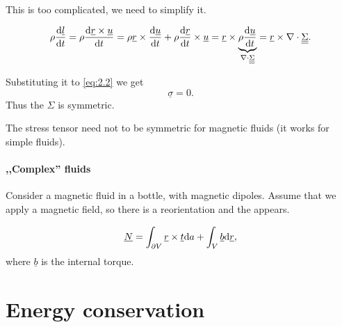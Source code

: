 \documentclass[11pt,oneside]{book}
\renewcommand{\vec}[1]{\underline{#1}}
\theoremstyle{definition} %
\theoremstyle{plain} %
\theoremstyle{remark} %
\theoremstyle{underline}
\begin{document}
  This is too complicated, we need to simplify it.
  
  \begin{displaymath}
    \rho \dfrac{ \vec l }{t} = \rho \dfrac{\vec r \times \vec u}{t} 
    = \rho \vec r \times \dfrac{\vec u}{t} + \rho \dfrac{ \vec r }{t} \times \vec u
    = \vec r \times \underbrace{\rho \dfrac{\vec u}{t}}_{\nabla \cdot \ten \Sigma} 
    = \vec r \times \nabla \cdot \ten \Sigma.
  \end{displaymath}

  Substituting it to  \ref{eq:2.2} we get
  \begin{displaymath}
    \vec \sigma = 0.
  \end{displaymath}
  Thus the $\Sigma $ is symmetric.

  The stress tensor need not to be symmetric for magnetic fluids (it works for simple fluids).


  \paragraph{,,Complex'' fluids}

  Consider a magnetic fluid in a bottle, with magnetic dipoles.
  Assume that we apply a magnetic field, so there is a reorientation and the  appears.
  
  \begin{displaymath}
    \vec N = \int_{\partial V} \vec r \times \vec t \d a + \int_{V} \vec b \d \vec r,
  \end{displaymath}
  where $\vec b$ is the internal torque.
  
  
  \section{Energy conservation}
  \begin{figure}
    \centering
  \end{figure}
\end{document}
